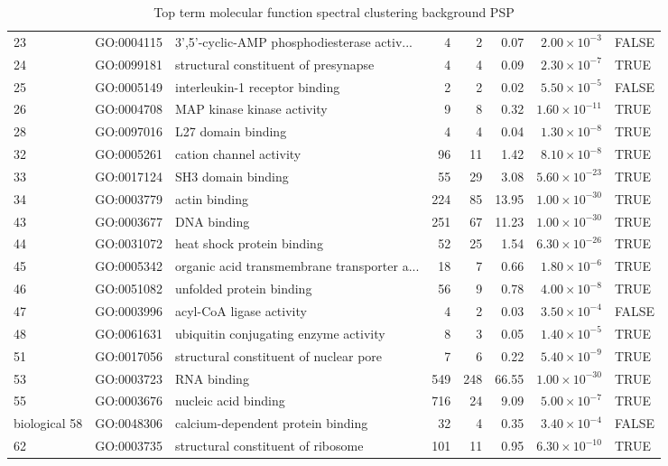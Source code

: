 \begin{table}[ht]
\begin{adjustbox}{max width=\textwidth}
\begin{tabular}{lllrrrrl}
  23 & GO:0004115 & 3',5'-cyclic-AMP phosphodiesterase activ... & 4 & 2 & 0.07 & $2.00 \times 10^{-3}$ & FALSE \\ 
  24 & GO:0099181 & structural constituent of presynapse & 4 & 4 & 0.09 & $2.30 \times 10^{-7}$ & TRUE \\ 
  25 & GO:0005149 & interleukin-1 receptor binding & 2 & 2 & 0.02 & $5.50 \times 10^{-5}$ & FALSE \\ 
  26 & GO:0004708 & MAP kinase kinase activity & 9 & 8 & 0.32 & $1.60 \times 10^{-11}$ & TRUE \\ 
  28 & GO:0097016 & L27 domain binding & 4 & 4 & 0.04 & $1.30 \times 10^{-8}$ & TRUE \\ 
  32 & GO:0005261 & cation channel activity & 96 & 11 & 1.42 & $8.10 \times 10^{-8}$ & TRUE \\ 
  33 & GO:0017124 & SH3 domain binding & 55 & 29 & 3.08 & $5.60 \times 10^{-23}$ & TRUE \\ 
  34 & GO:0003779 & actin binding & 224 & 85 & 13.95 & $1.00 \times 10^{-30}$ & TRUE \\ 
  43 & GO:0003677 & DNA binding & 251 & 67 & 11.23 & $1.00 \times 10^{-30}$ & TRUE \\ 
  44 & GO:0031072 & heat shock protein binding & 52 & 25 & 1.54 & $6.30 \times 10^{-26}$ & TRUE \\ 
  45 & GO:0005342 & organic acid transmembrane transporter a... & 18 & 7 & 0.66 & $1.80 \times 10^{-6}$ & TRUE \\ 
  46 & GO:0051082 & unfolded protein binding & 56 & 9 & 0.78 & $4.00 \times 10^{-8}$ & TRUE \\ 
  47 & GO:0003996 & acyl-CoA ligase activity & 4 & 2 & 0.03 & $3.50 \times 10^{-4}$ & FALSE \\ 
  48 & GO:0061631 & ubiquitin conjugating enzyme activity & 8 & 3 & 0.05 & $1.40 \times 10^{-5}$ & TRUE \\ 
  51 & GO:0017056 & structural constituent of nuclear pore & 7 & 6 & 0.22 & $5.40 \times 10^{-9}$ & TRUE \\ 
  53 & GO:0003723 & RNA binding & 549 & 248 & 66.55 & $1.00 \times 10^{-30}$ & TRUE \\ 
  55 & GO:0003676 & nucleic acid binding & 716 & 24 & 9.09 & $5.00 \times 10^{-7}$ & TRUE \\ biological
  58 & GO:0048306 & calcium-dependent protein binding & 32 & 4 & 0.35 & $3.40 \times 10^{-4}$ & FALSE \\ 
  62 & GO:0003735 & structural constituent of ribosome & 101 & 11 & 0.95 & $6.30 \times 10^{-10}$ & TRUE \\ 
   \hline
\end{tabular}
\end{adjustbox}
\caption{Top term molecular function spectral clustering background PSP} 
\label{tab:Top term molecular function spectral clustering background PSP}
\end{table}



